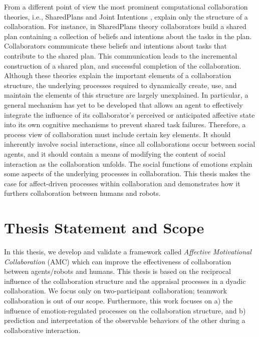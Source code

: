 \documentclass[12pt]{report}
\begin{document}
From a different point of view the most prominent computational collaboration
theories, i.e., SharedPlans
\cite{grosz:collaboration,grosz:plans-discourse} and Joint
Intentions \cite{cohen:teamwork}, explain only the structure of a collaboration.
For instance, in SharedPlans theory collaborators build a shared plan containing
a collection of beliefs and intentions about the tasks in the plan.
Collaborators communicate these beliefs and intentions about tasks that
contribute to the shared plan. This communication leads to the incremental
construction of a shared plan, and successful completion of the collaboration.
Although these theories explain the important elements of a collaboration
structure, the underlying processes required to dynamically create, use, and
maintain the elements of this structure are largely unexplained. In particular,
a general mechanism has yet to be developed that allows an agent to effectively
integrate the influence of its collaborator's perceived or anticipated affective
state into its own cognitive mechanisms to prevent shared task failures.
Therefore, a process view of collaboration must include certain key elements. It
should inherently involve social interactions, since all collaborations occur
between social agents, and it should contain a means of modifying the content of
social interaction as the collaboration unfolds. The social functions of
emotions explain some aspects of the underlying processes in collaboration. This
thesis makes the case for affect-driven processes within collaboration and
demonstrates how it furthers collaboration between humans and robots.

\section{Thesis Statement and Scope}

In this thesis, we develop and validate a framework called \textit{Affective
Motivational Collaboration} (AMC) which can improve the effectiveness of
collaboration between agents/robots and humans. This thesis is based on the
reciprocal influence of the collaboration structure and the appraisal processes
in a dyadic collaboration. We focus only on two-participant collaboration; teamwork
collaboration is out of our scope. Furthermore, this work focuses on a) the
influence of emotion-regulated processes on the collaboration structure, and b)
prediction and interpretation of the observable behaviors of the other during a
collaborative interaction.
\end{document}

